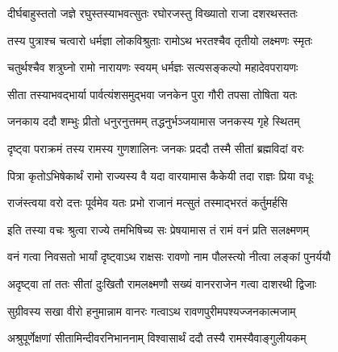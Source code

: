 

\vakta{}
\shrota{}
\translink{}

\storymeta



\addtocounter{shlokacount}{47}

\twolineshloka
{दीर्घबाहुस्ततो जज्ञे रघुस्तस्याभवत्सुतः}
{रघोरजस्तु विख्यातो राजा दशरथस्ततः} %

\twolineshloka
{तस्य पुत्राश्च चत्वारो धर्मज्ञा लोकविश्रुताः}
{रामोऽथ भरतश्चैव तृतीयो लक्ष्मणः स्मृतः} %

\twolineshloka
{चतुर्थश्चैव शत्रुघ्नो रामो नारायणः स्वयम्}
{धर्मज्ञः सत्यसङ्कल्पो महादेवपरायणः} %

\twolineshloka
{सीता तस्याभवद्भार्या पार्वत्यंशसमुद्भवा}
{जनकेन पुरा गौरी तपसा तोषिता यतः} %

\twolineshloka
{जनकाय ददौ शम्भुः प्रीतो धनुरनुत्तमम्}
{तद्धनुर्भञ्जयामास जनकस्य गृहे स्थितम्} %

\twolineshloka
{दृष्ट्वा पराक्रमं तस्य रामस्य गुणशालिनः}
{जनकः प्रददौ तस्मै सीतां ब्रह्मविदां वरः} %

\twolineshloka
{पित्रा कृतोऽभिषेकार्थं रामो राज्यस्य वै यदा}
{वारयामास कैकेयी तदा राज्ञः प्रिया वधूः} %

\twolineshloka
{राजंस्त्वया वरो दत्तः पूर्वमेव यतः प्रभो}
{राजानं मत्सुतं तस्माद्भरतं कर्तुमर्हसि} %

\twolineshloka
{इति तस्या वचः श्रुत्वा राज्ये तमभिषिच्य सः}
{प्रेषयामास तं रामं वनं प्रति सलक्ष्मणम्} %

\twolineshloka
{वनं गत्वा निवसतो भार्यां दृष्ट्वाऽथ राक्षसः}
{रावणो नाम पौलस्त्यो नीत्वा लङ्कां पुनर्ययौ} %

\twolineshloka
{अदृष्ट्वा तां ततः सीतां दुःखितौ रामलक्ष्मणौ}
{सख्यं वानरराजेन गत्वा दाशरथी द्विजाः} %

\twolineshloka
{सुग्रीवस्य सखा वीरो हनुमान्नाम वानरः}
{गत्वाऽथ रावणपुरीमपश्यज्जनकात्मजाम्} %

\twolineshloka
{अश्रुपूर्णेक्षणां सीतामिन्दीवरनिभाननाम्}
{विश्वासार्थं ददौ तस्यै रामस्यैवाङ्गुलीयकम्} %

